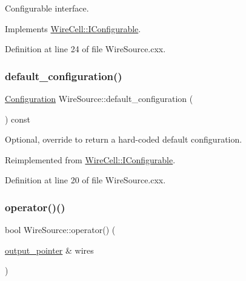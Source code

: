 Configurable interface. 

Implements \hyperlink{class_wire_cell_1_1_i_configurable_a57ff687923a724093df3de59c6ff237d}{Wire\+Cell\+::\+I\+Configurable}.



Definition at line 24 of file Wire\+Source.\+cxx.

\mbox{\label{class_wire_cell_1_1_wire_source_ad691cb96dcbb5bca637640367d0ad759}} 
\subsubsection{\texorpdfstring{default\+\_\+configuration()}{default\_configuration()}}
{\footnotesize\ttfamily \hyperlink{namespace_wire_cell_a9f705541fc1d46c608b3d32c182333ee}{Configuration} Wire\+Source\+::default\+\_\+configuration (\begin{DoxyParamCaption}{ }\end{DoxyParamCaption}) const\hspace{0.3cm}{\ttfamily [virtual]}}



Optional, override to return a hard-\/coded default configuration. 



Reimplemented from \hyperlink{class_wire_cell_1_1_i_configurable_a54841b2da3d1ea02189478bff96f7998}{Wire\+Cell\+::\+I\+Configurable}.



Definition at line 20 of file Wire\+Source.\+cxx.

\mbox{\label{class_wire_cell_1_1_wire_source_a0d8e39c5e5248cc34efa1d1655a0e52b}} 
\subsubsection{\texorpdfstring{operator()()}{operator()()}}
{\footnotesize\ttfamily bool Wire\+Source\+::operator() (\begin{DoxyParamCaption}\item[{\hyperlink{class_wire_cell_1_1_i_source_node_ae2743237513016d7f69d68aac1104951}{output\+\_\+pointer} \&}]{wires }\end{DoxyParamCaption})\hspace{0.3cm}{\ttfamily [virtual]}}




